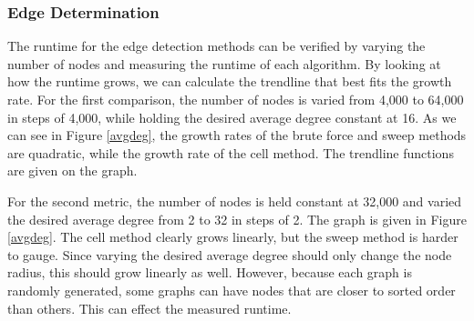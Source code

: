\documentclass{article}
\begin{document}
        \subsubsection{Edge Determination}
        The runtime for the edge detection methods can be verified by varying the number of nodes and measuring the runtime of each algorithm. By looking at how the runtime grows, we can calculate the trendline that best fits the growth rate. For the first comparison, the number of nodes is varied from 4,000 to 64,000 in steps of 4,000, while holding the desired average degree constant at 16. As we can see in Figure \ref{avgdeg}, the growth rates of the brute force and sweep methods are quadratic, while the growth rate of the cell method. The trendline functions are given on the graph.
        \par
        For the second metric, the number of nodes is held constant at 32,000 and varied the desired average degree from 2 to 32 in steps of 2. The graph is given in Figure \ref{avgdeg}. The cell method clearly grows linearly, but the sweep method is harder to gauge. Since varying the desired average degree should only change the node radius, this should grow linearly as well. However, because each graph is randomly generated, some graphs can have nodes that are closer to sorted order than others. This can effect the measured runtime.
\end{document}
